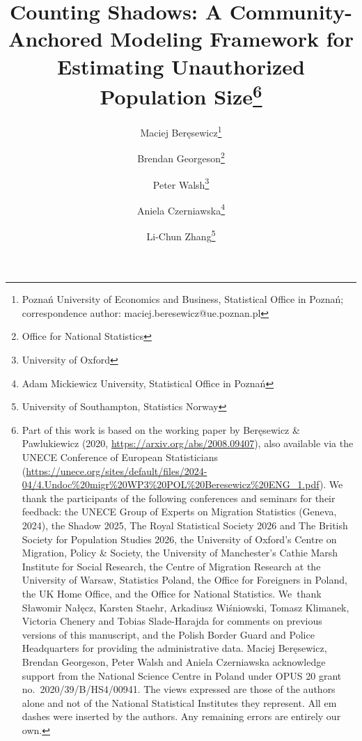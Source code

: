 



\title{Counting Shadows: A Community-Anchored Modeling Framework for
Estimating Unauthorized Population
Size\thanks{Part of this work is based on the working paper by Beręsewicz \& Pawlukiewicz (2020, \url{https://arxiv.org/abs/2008.09407}), also available via the UNECE Conference of European Statisticians (\url{https://unece.org/sites/default/files/2024-04/4.Undoc\%20migr\%20WP3\%20POL\%20Beresewicz\%20ENG_1.pdf}). We thank the participants of the following conferences and seminars for their feedback: the UNECE Group of Experts on Migration Statistics (Geneva, 2024), the Shadow 2025, The Royal Statistical Society 2026 and The British Society for Population Studies 2026, the University of Oxford's Centre on Migration, Policy \& Society, the University of Manchester's Cathie Marsh Institute for Social Research, the Centre of Migration Research at the University of Warsaw, Statistics Poland, the Office for Foreigners in Poland, the UK Home Office, and the Office for National Statistics. We~thank Sławomir Nałęcz, Karsten Staehr, Arkadiusz Wiśniowski, Tomasz Klimanek, Victoria Chenery and Tobias Slade-Harajda for comments on previous versions of this manuscript, and the Polish Border Guard and Police Headquarters for providing the administrative data. Maciej Beręsewicz, Brendan Georgeson, Peter Walsh and Aniela Czerniawska acknowledge support from the National Science Centre in Poland under OPUS 20 grant no.\ 2020/39/B/HS4/00941. The views expressed are those of the authors alone and not of the National Statistical Institutes they represent. All em dashes were inserted by the authors. Any remaining errors are entirely our own.}}
\author{Maciej Beręsewicz\thanks{Poznań University of Economics and Business, Statistical Office in Poznań; correspondence author: maciej.beresewicz@ue.poznan.pl} \and 
Brendan Georgeson\thanks{Office for National Statistics} \and 
Peter Walsh\thanks{University of Oxford} \and 
Aniela Czerniawska\thanks{Adam Mickiewicz University, Statistical Office in Poznań} \and 
Li-Chun Zhang\thanks{University of Southampton, Statistics Norway}}
\date{}


\maketitle

\doublespacing

